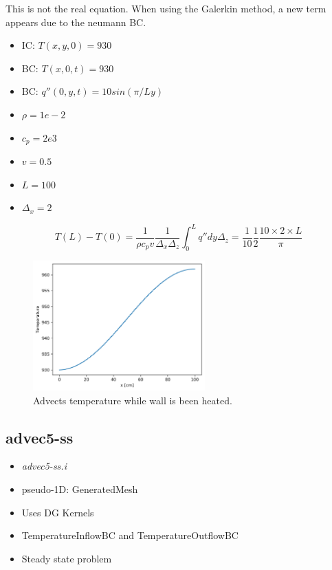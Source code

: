 \documentclass[11pt,letterpaper]{article}
\begin{document}
    This is not the real equation. When using the Galerkin method, a new term appears due to the neumann BC.

	\begin{itemize}
		\item IC: $T(x, y, 0) = 930$
		\item BC: $T(x, 0, t) = 930$
		\item BC: $q''(0, y, t) = 10 sin (\pi/L y)$
		\item $\rho = 1e-2$
		\item $c_p = 2e3$
		\item $v = 0.5$
		\item $L = 100$
		\item $\Delta_x = 2$
	\end{itemize}

	\begin{equation}
	T(L) - T(0) = \frac{1}{\rho c_p v}\frac{1}{\Delta_x \Delta_z}\int^L_0 q'' dy \Delta_z= \frac{1}{10} \frac{1}{2} \frac{10 \times 2 \times L}{\pi}
	\end{equation}

	\begin{figure}[htbp!]
		\centering
		\includegraphics[height=5cm]{advec5-t-251}
		\caption{Advects temperature while wall is been heated.}
		\label{fig:advec5-t}
	\end{figure}

	\subsection{advec5-ss}

	\begin{itemize}
		\item \textit{advec5-ss.i}
		\item pseudo-1D: GeneratedMesh
		\item Uses DG Kernels
		\item TemperatureInflowBC and TemperatureOutflowBC
		\item Steady state problem
	\end{itemize}
\end{document}
